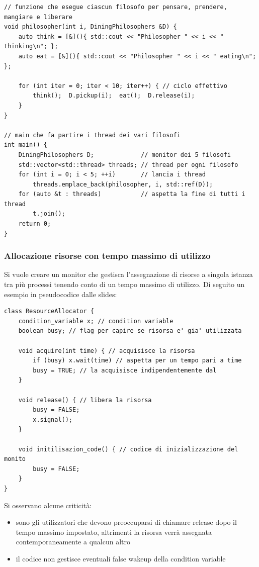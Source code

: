 \documentclass[a4paper]{article}
\begin{document}
\begin{lstlisting}
// funzione che esegue ciascun filosofo per pensare, prendere, mangiare e liberare
void philosopher(int i, DiningPhilosophers &D) { 
    auto think = [&](){ std::cout << "Philosopher " << i << " thinking\n"; };
    auto eat = [&](){ std::cout << "Philosopher " << i << " eating\n"; };

    for (int iter = 0; iter < 10; iter++) { // ciclo effettivo
        think();  D.pickup(i);  eat();  D.release(i);
    }
}

// main che fa partire i thread dei vari filosofi
int main() {
    DiningPhilosophers D;             // monitor dei 5 filosofi
    std::vector<std::thread> threads; // thread per ogni filosofo
    for (int i = 0; i < 5; ++i)       // lancia i thread
        threads.emplace_back(philosopher, i, std::ref(D));
    for (auto &t : threads)           // aspetta la fine di tutti i thread
		t.join();
    return 0;
}
\end{lstlisting}

\subsubsection*{Allocazione risorse con tempo massimo di utilizzo}
Si vuole creare un monitor che gestisca l'assegnazione di risorse a singola istanza tra più processi tenendo conto di un tempo
massimo di utilizzo. Di seguito un esempio in pseudocodice dalle slides:

\begin{lstlisting}
class ResourceAllocator {
	condition_variable x; // condition variable
	boolean busy; // flag per capire se risorsa e' gia' utilizzata

	void acquire(int time) { // acquisisce la risorsa
		if (busy) x.wait(time) // aspetta per un tempo pari a time
		busy = TRUE; // la acquisisce indipendentemente dal
	}

	void release() { // libera la risorsa
		busy = FALSE;
		x.signal();
	}

	void initilisazion_code() { // codice di inizializzazione del monito
		busy = FALSE;
	}
}
\end{lstlisting}

Si osservano alcune criticità:
\begin{itemize}
	\item sono gli utilizzatori che devono preoccuparsi di chiamare release dopo il tempo massimo impostato, altrimenti la
	risorsa verrà assegnata contemporaneamente a qualcun altro
	\item il codice non gestisce eventuali false wakeup della condition variable
\end{itemize}
\end{document}
